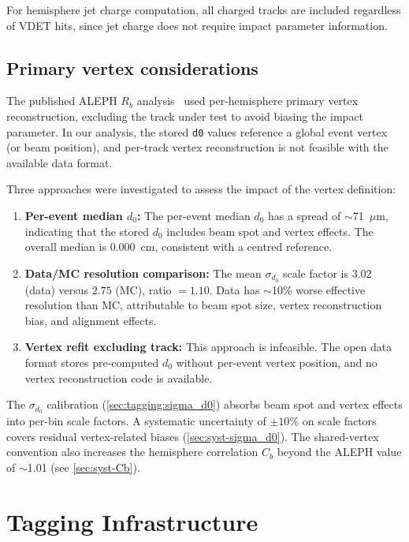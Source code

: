 \documentclass[11pt,a4paper]{article}
\begin{document}
For hemisphere jet charge computation, all charged tracks are
included regardless of VDET hits, since jet charge does not
require impact parameter information.

\subsection{Primary vertex considerations}
\label{sec:selection:vertex}

The published ALEPH $R_b$ analysis~\cite{ALEPH:Rb:1996} used
per-hemisphere primary vertex reconstruction, excluding the track
under test to avoid biasing the impact parameter.
In our analysis, the stored \texttt{d0} values reference a global
event vertex (or beam position), and per-track vertex reconstruction
is not feasible with the available data format.

Three approaches were investigated to assess the impact of the
vertex definition:
\begin{enumerate}
\item \textbf{Per-event median $d_0$:} The per-event median $d_0$
  has a spread of $\sim$71~$\mu$m, indicating that the stored
  $d_0$ includes beam spot and vertex effects.
  The overall median is $0.000$~cm, consistent with a centred
  reference.
\item \textbf{Data/MC resolution comparison:} The mean
  $\sigma_{d_0}$ scale factor is $3.02$ (data) versus $2.75$ (MC),
  ratio $= 1.10$.
  Data has $\sim$10\% worse effective resolution than MC,
  attributable to beam spot size, vertex reconstruction bias,
  and alignment effects.
\item \textbf{Vertex refit excluding track:} This approach is
  infeasible.
  The open data format stores pre-computed $d_0$ without per-event
  vertex position, and no vertex reconstruction code is available.
\end{enumerate}

The $\sigma_{d_0}$ calibration (\cref{sec:tagging:sigma_d0})
absorbs beam spot and vertex effects into per-bin scale factors.
A systematic uncertainty of $\pm 10\%$ on scale factors covers
residual vertex-related biases (\cref{sec:syst-sigma_d0}).
The shared-vertex convention also increases the hemisphere
correlation $C_b$ beyond the ALEPH value of $\sim$1.01
(see \cref{sec:syst-Cb}).

\section{Tagging Infrastructure}
\label{sec:tagging}
\end{document}
